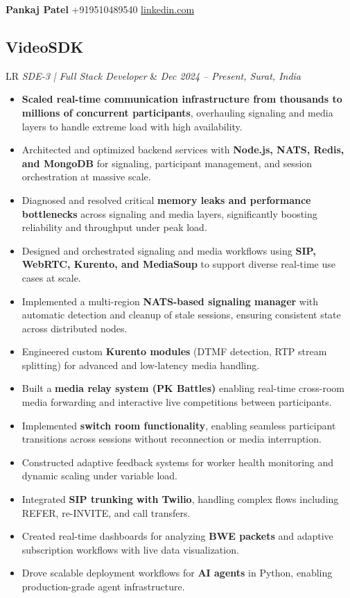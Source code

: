 \documentclass[11pt,a4paper]{moderncv}
\newcommand*{\experienceentry}[5][1.5mm]{
    \subsection{#2} \vspace{-1.5mm}
    \begin{tabularx}{\textwidth}{LR}
        {\itshape #3} & {\itshape #4, #5}
    \end{tabularx}
    \par\addvspace{#1}
}
\begin{document}
\begin{center}
    {\LARGE\bfseries\color{color1} Pankaj Patel}\quad{\color{gray}\textbar}\quad
    \emailsymbol\enspace {}\enspace{\color{gray}\textbar}\enspace
    \mobilephonesymbol\enspace +919510489540\enspace{\color{gray}\textbar}\enspace
    \faLinkedin\enspace \href{https://www.linkedin.com/in/pankaj-patel-72332b228}{linkedin.com}
\end{center}
\vspace{-4.0mm}

\begin{minipage}[t]{0.62\textwidth}
\experienceentry{VideoSDK}{SDE-3 | Full Stack Developer}{Dec 2024 – Present}{Surat, India}

\begin{itemize}
    \item \textbf{Scaled real-time communication infrastructure from thousands to millions of concurrent participants}, overhauling signaling and media layers to handle extreme load with high availability.
    \item Architected and optimized backend services with \textbf{Node.js, NATS, Redis, and MongoDB} for signaling, participant management, and session orchestration at massive scale.
    \item Diagnosed and resolved critical \textbf{memory leaks and performance bottlenecks} across signaling and media layers, significantly boosting reliability and throughput under peak load.
    \item Designed and orchestrated signaling and media workflows using \textbf{SIP, WebRTC, Kurento, and MediaSoup} to support diverse real-time use cases at scale.
    \item Implemented a multi-region \textbf{NATS-based signaling manager} with automatic detection and cleanup of stale sessions, ensuring consistent state across distributed nodes.
    \item Engineered custom \textbf{Kurento modules} (DTMF detection, RTP stream splitting) for advanced and low-latency media handling.
    \item Built a \textbf{media relay system (PK Battles)} enabling real-time cross-room media forwarding and interactive live competitions between participants.
    \item Implemented \textbf{switch room functionality}, enabling seamless participant transitions across sessions without reconnection or media interruption.
    \item Constructed adaptive feedback systems for worker health monitoring and dynamic scaling under variable load.
    \item Integrated \textbf{SIP trunking with Twilio}, handling complex flows including REFER, re-INVITE, and call transfers.
    \item Created real-time dashboards for analyzing \textbf{BWE packets} and adaptive subscription workflows with live data visualization.
    \item Drove scalable deployment workflows for \textbf{AI agents} in Python, enabling production-grade agent infrastructure.
\end{itemize}


\end{minipage}
\end{document}
